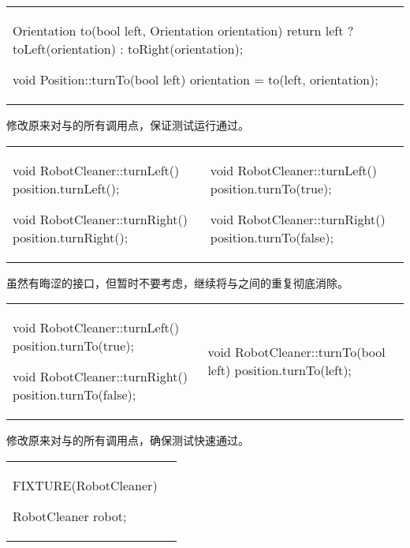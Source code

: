 \begin{content}
\begin{tabular}{@{}p{}%
                 | p{}@{}}
\begin{c++}[caption={src/robot-cleaner/Position.cpp}]
{    Orientation to(bool left, Orientation orientation)
    {
       return left ? toLeft(orientation) : toRight(orientation);
    }
}

void Position::turnTo(bool left)
{
    orientation = to(left, orientation);
}
\end{c++}
\end{tabular}

修改原来对与的所有调用点，保证测试运行通过。

\begin{tabular}{@{}p{} 
                 | p{}@{}}
\begin{c++}[caption={src/robot-cleaner/RobotCleaner.cpp}]
void RobotCleaner::turnLeft()
{
    position.turnLeft();
}

void RobotCleaner::turnRight()
{
    position.turnRight();
}
\end{c++}
&
\begin{c++}[caption={src/robot-cleaner/RobotCleaner.cpp}]
void RobotCleaner::turnLeft()
{
    position.turnTo(true);
}

void RobotCleaner::turnRight()
{
    position.turnTo(false);
}
\end{c++}
\end{tabular}

虽然有晦涩的接口，但暂时不要考虑，继续将与之间的重复彻底消除。

\begin{tabular}{@{}p{} 
                 | p{}@{}}
\begin{c++}[caption={src/robot-cleaner/RobotCleaner.cpp}]
void RobotCleaner::turnLeft()
{
    position.turnTo(true);
}

void RobotCleaner::turnRight()
{
    position.turnTo(false);
}
\end{c++}
&
\begin{c++}[caption={src/robot-cleaner/RobotCleaner.cpp}]
void RobotCleaner::turnTo(bool left)
{
    position.turnTo(left);
}
\end{c++}
\end{tabular}

修改原来对与的所有调用点，确保测试快速通过。

\begin{tabular}{@{}p{} 
                 | p{}@{}}
\begin{c++}[caption={test/robot-cleaner/TestRobotCleaner.h}]
FIXTURE(RobotCleaner)
{
    RobotCleaner robot;

}
\end{c++}
\end{tabular}
\end{content}
